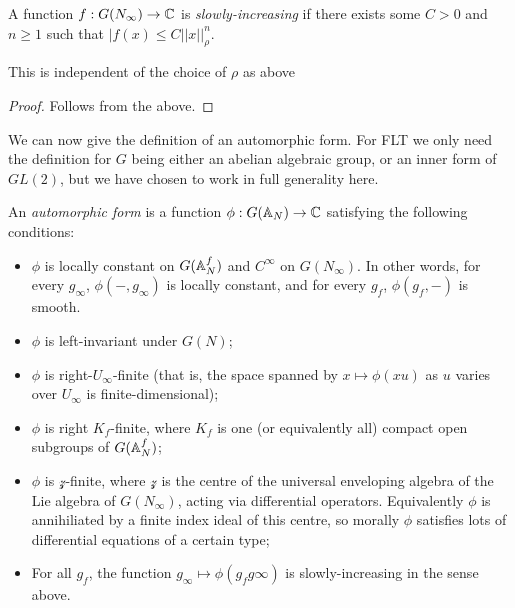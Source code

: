 \begin{definition}\label{slowly_increasing}\notready A function $f : G(N_\infty)\to{\mathbb{C}}$ is \emph{slowly-increasing} if there exists some $C>0$
    and $n\geq1$ such that $|f(x)\leq C||x||_\rho^n$.
\end{definition}

\begin{theorem}\label{slowly_increasing_well_defined}\notready This is independent of the choice of $\rho$ as above
\end{theorem}
\begin{proof} Follows from the above.
\end{proof}

We can now give the definition of an automorphic form. For FLT we only need the definition for $G$ being either an abelian algebraic group, or an inner form of $GL(2)$, but we have chosen to work in full generality here. 

\begin{definition}\label{automorphic_form}\notready An \emph{automorphic form} is a function $\phi:G(\mathbb{A}_N)\to{\mathbb{C}}$ satisfying the following conditions:
    \begin{itemize}
        \item $\phi$ is locally constant on $G(\mathbb{A}_N^f)$ and $C^\infty$ on $G(N_\infty)$. In other words, for every $g_\infty$, $\phi(-,g_\infty)$ is locally constant, and for every $g_f$, $\phi(g_f,-)$ is smooth.
        \item $\phi$ is left-invariant under $G(N)$;
        \item $\phi$ is right-$U_\infty$-finite (that is, the space spanned by $x\mapsto \phi(xu)$ as $u$ varies over $U_\infty$ is finite-dimensional);
        \item $\phi$ is right $K_f$-finite, where $K_f$ is one (or equivalently all) compact open subgroups of $G(\mathbb{A}_N^f)$;
        \item $\phi$ is $\mathcal{z}$-finite, where $\mathcal{z}$ is the centre of the universal enveloping algebra of the Lie algebra of $G(N_\infty)$, acting via differential operators. Equivalently $\phi$ is annihiliated by a finite index ideal of this centre, so morally $\phi$ satisfies lots of differential equations of a certain type;
        \item For all $g_f$, the function $g_\infty\mapsto \phi(g_f g\infty)$ is slowly-increasing in the sense above.
    \end{itemize}
\end{definition}

